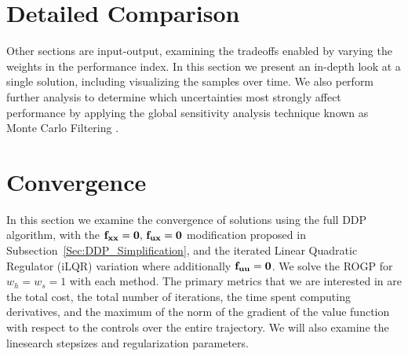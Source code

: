 \section{Detailed Comparison}
Other sections are input-output, examining the tradeoffs enabled by varying the weights in the performance index. In this section we present an in-depth look at a single solution, including visualizing the samples over time. We also perform further analysis to determine which uncertainties most strongly affect performance by applying the global sensitivity analysis technique known as Monte Carlo Filtering \cite{MonteCarloFiltering}. 



\section{Convergence}
In this section we examine the convergence of solutions using the full DDP algorithm, with the $\mathbf{f}_{\mathbf{x}\mathbf{x}}=\mathbf{0},\, \mathbf{f}_{\mathbf{u}\mathbf{x}}=\mathbf{0}$ modification proposed in Subsection~\ref{Sec:DDP_Simplification}, and the iterated Linear Quadratic Regulator (iLQR) variation where additionally $\mathbf{f}_{\mathbf{u}\mathbf{u}}=\mathbf{0}$. We solve the ROGP for $w_h=w_s=1$ with each method. The primary metrics that we are interested in are the total cost, the total number of iterations, the time spent computing derivatives, and the maximum of the norm of the gradient of the value function with respect to the controls over the entire trajectory. We will also examine the linesearch stepsizes and regularization parameters.

